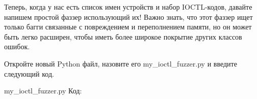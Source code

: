 \documentclass[12pt, a4paper, oneside]{book}
\begin{document}
Теперь, когда у нас есть список имен устройств и набор IOCTL-кодов, давайте напишем простой фаззер использующий их! Важно знать, что этот фаззер ищет только багги связанные с повреждением и переполнением памяти, но он может быть легко расширен, чтобы иметь более широкое покрытие других классов ошибок. 

Откройте новый Python файл, назовите его my\_ioctl\_fuzzer.py и введите следующий код.

my\_ioctl\_fuzzer.py
Код:















\end{document}
